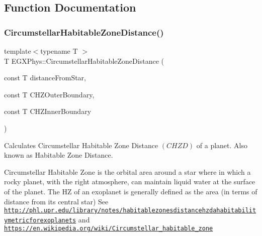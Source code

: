 \subsection{Function Documentation}
\mbox{\label{group___e_g_x_phys-_circumstellar_habitable_zone_limit_ga3247e5fe14db39121ce622207af172fd}} 
\subsubsection{\texorpdfstring{Circumstellar\+Habitable\+Zone\+Distance()}{CircumstellarHabitableZoneDistance()}}
{\footnotesize\ttfamily template$<$typename T $>$ \\
T E\+G\+X\+Phys\+::\+Circumstellar\+Habitable\+Zone\+Distance (\begin{DoxyParamCaption}\item[{const T}]{distance\+From\+Star,  }\item[{const T}]{C\+H\+Z\+Outer\+Boundary,  }\item[{const T}]{C\+H\+Z\+Inner\+Boundary }\end{DoxyParamCaption})}



Calculates Circumstellar Habitable Zone Distance $(CHZD)$ of a planet. Also known as Habitable Zone Distance. 

Circumstellar Habitable Zone is the orbital area around a star where in which a rocky planet, with the right atmosphere, can maintain liquid water at the surface of the planet. The HZ of an exoplanet is generally defined as the area (in terms of distance from its central star) See \href{http://phl.upr.edu/library/notes/habitablezonesdistancehzdahabitabilitymetricforexoplanets}{\tt http\+://phl.\+upr.\+edu/library/notes/habitablezonesdistancehzdahabitabilitymetricforexoplanets} and \href{https://en.wikipedia.org/wiki/Circumstellar_habitable_zone}{\tt https\+://en.\+wikipedia.\+org/wiki/\+Circumstellar\+\_\+habitable\+\_\+zone}

